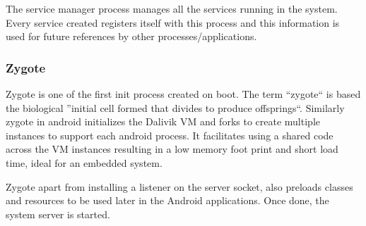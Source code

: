 The service manager process manages all the services running in the system.
Every service created registers itself with this process and this information
is used for future references by other processes/applications.

\subsubsection{Zygote}

Zygote is one of the first init process created on boot. The term ``zygote`` is based the biological ''initial cell formed
that divides to produce offsprings``. Similarly zygote in android initializes the Dalivik VM and
forks to create multiple instances to support each android process. It facilitates using a shared code
across the VM instances resulting in a low memory foot print and short load time, ideal for an embedded system.

Zygote apart from installing a listener on the server socket, also preloads classes and
resources to be used later in the Android applications. Once done, the system server is started.

  
  

